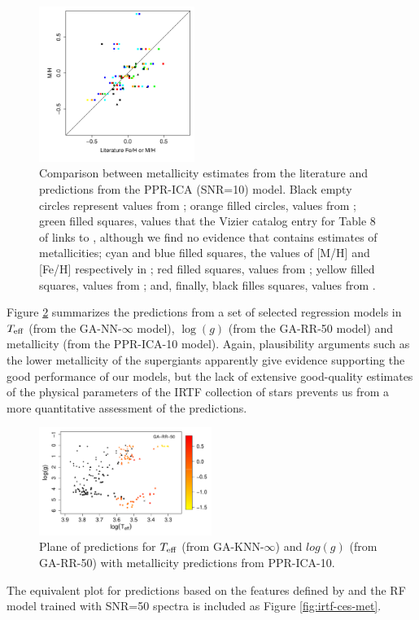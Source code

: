  \begin{figure}
 \centering
 \includegraphics[width=0.45\textwidth]{figs/irtf-figs/M-ICA10}

\caption{Comparison
  between metallicity estimates from the literature and predictions
  from the PPR-ICA (SNR=10) model.  Black empty circles represent
  values from \protect\cite{cesetti} ; orange filled circles, values
  from \protect\cite{NevesIII}; green filled squares, values that the
  Vizier catalog entry for Table 8 of \protect\cite{NevesIII} links
  to \protect\cite{Jao}, although we find no evidence
  that \protect\cite{Jao} contains estimates of metallicities; cyan
  and blue filled squares, the values of [M/H] and [Fe/H] respectively
  in \protect\cite{RA2012}; red filled squares, values
  from \protect\cite{Mann2015}; yellow filled squares, values
  from \protect\cite{Newton2014}; and, finally, black filles squares, values
  from \protect\cite{Gaidos2015}.}

\label{MIRTF_ICA_10}
\end {figure}

Figure \ref{fig:irtf-teff-logg-met} summarizes the predictions from a
set of selected regression models in $T_{\rm eff}$ (from the
GA-NN-$\infty$ model), $\log(g)$ (from the GA-RR-50 model) and
metallicity (from the PPR-ICA-10 model). Again, plausibility arguments
such as the lower metallicity of the supergiants apparently give
evidence supporting the good performance of our models, but the lack
of extensive good-quality estimates of the physical parameters of the
IRTF collection of stars prevents us from a more quantitative
assessment of the predictions.

 \begin{figure}
 \centering
 \includegraphics[width=0.5\textwidth]{figs/ordieres-fig8}
\caption{Plane of predictions for $T_{\rm eff}$ (from GA-KNN-$\infty$)
and $log(g)$ (from GA-RR-50) with metallicity predictions from
PPR-ICA-10.}
\label{fig:irtf-teff-logg-met}
\end {figure}

The equivalent plot for predictions based on the features defined
by \cite{cesetti} and the RF model trained with SNR=50 spectra is
included as Figure \ref{fig:irtf-ces-met}.


